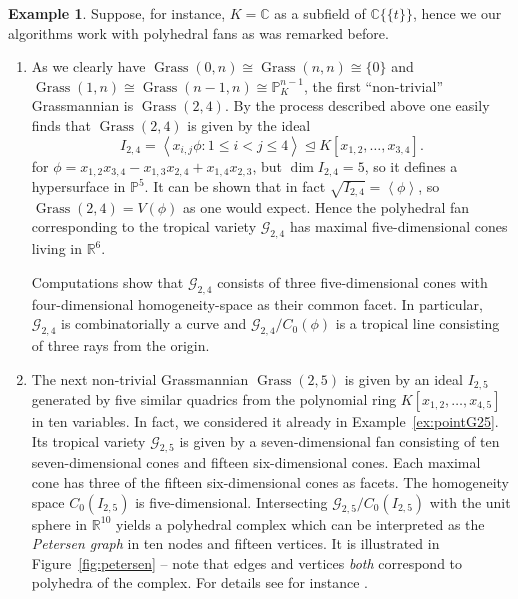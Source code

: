 \documentclass[
  paper=a4,
  titlepage,
  bibliography=totoc,
  pagesize=pdftex
]{scrartcl}
\numberwithin{figure}{section}
\numberwithin{equation}{section}
\numberwithin{table}{section}
\newcommand*\setR{\mathds{R}}
\newcommand*\setC{\mathds{C}}
\newcommand*\setP{\mathds{P}}
\newcommand*\ideal[1]{\left\langle #1 \right\rangle}
\newcommand*\puiseux[2]{#1\{\!\{#2\}\!\}}
\newcommand*\CCt{\puiseux{\setC}{t}}
\let\idealof\trianglelefteq
\DeclareMathOperator{\Grass}{Grass}
\theoremstyle{definition}
\newtheorem{example}[definition]{Example}
\numberwithin{definition}{section}
\begin{document}
\begin{example} \label{ex:tropGrass}
  Suppose, for instance, $K = \setC$ as a subfield of $\CCt$, hence we our algorithms work
  with polyhedral fans as was remarked before.
  \begin{enumerate}
    \item As we clearly have $\Grass(0,n) \cong \Grass(n,n) \cong \{0\}$ and $\Grass(1,n)
      \cong \Grass(n-1, n) \cong \setP_K^{n-1}$, the first \enquote{non-trivial}
      Grassmannian is $\Grass(2,4)$. By the process described above one easily finds that
      $\Grass(2,4)$ is given by the ideal
      \[
        I_{2,4} = \ideal{ x_{i,j} \phi : 1 \leq i < j \leq 4 }
        \idealof K[x_{1,2}, \dots, x_{3,4}].
      \]
      for $\phi = x_{1,2}x_{3,4} - x_{1,3}x_{2,4} + x_{1,4}x_{2,3}$, but $\dim I_{2,4} =
      5$, so it defines a hypersurface in $\setP^5$. It can be shown that in fact
      $\sqrt{I_{2,4}} = \ideal \phi$, so $\Grass(2,4) = V(\phi)$ as one would expect.
      Hence the polyhedral fan corresponding to the tropical variety $\mathcal G_{2,4}$
      has maximal five-dimensional cones living in $\setR^6$.

      Computations show that $\mathcal G_{2,4}$ consists of three five-dimensional cones
      with four-dimensional homogeneity-space as their common facet. In particular,
      $\mathcal G_{2,4}$ is combinatorially a curve and $\mathcal G_{2,4}/C_0(\phi)$ is a
      tropical line consisting of three rays from the origin.
    \item The next non-trivial Grassmannian $\Grass(2,5)$ is given by an ideal $I_{2,5}$
      generated by five similar quadrics from the polynomial ring $K[x_{1,2}, \dots,
      x_{4,5}]$ in ten variables. In fact, we considered it already in
      Example~\ref{ex:pointG25}. Its tropical variety $\mathcal G_{2,5}$ is given by a
      seven-dimensional fan consisting of ten seven-dimensional cones and fifteen
      six-dimensional cones. Each maximal cone has three of the fifteen six-dimensional
      cones as facets. The homogeneity space $C_0(I_{2,5})$ is five-dimensional.
      Intersecting $\mathcal G_{2,5}/C_0(I_{2,5})$ with the unit sphere in $\setR^{10}$
      yields a polyhedral complex which can be interpreted as the \emph{Petersen graph} in
      ten nodes and fifteen vertices. It is illustrated in Figure~\ref{fig:petersen} --
      note that edges and vertices \emph{both} correspond to polyhedra of the complex. For
      details see for instance \cite[Example~9.10]{sturmSolve}.
  \end{enumerate}
\end{example}
\end{document}
